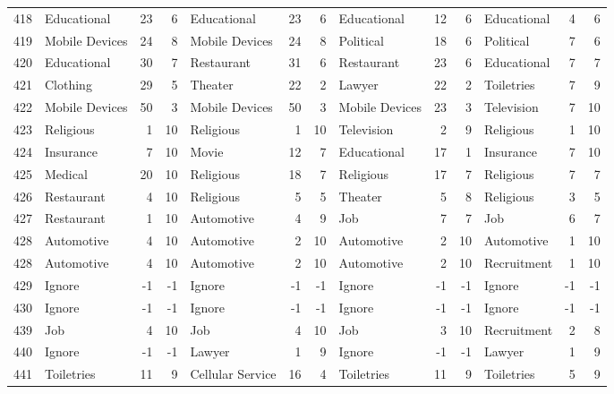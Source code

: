 \begin{figure}[htbp]
\begin{tabular}{rlrrlrrlrrlrr}
    418   & Educational & 23    & 6     & Educational & 23    & 6     & Educational & 12    & 6     & Educational & 4     & 6 \\
    419   & Mobile Devices & 24    & 8     & Mobile Devices & 24    & 8     & Political & 18    & 6     & Political & 7     & 6 \\
    420   & Educational & 30    & 7     & Restaurant & 31    & 6     & Restaurant & 23    & 6     & Educational & 7     & 7 \\
    421   & Clothing & 29    & 5     & Theater & 22    & 2     & Lawyer & 22    & 2     & Toiletries & 7     & 9 \\
    422   & Mobile Devices & 50    & 3     & Mobile Devices & 50    & 3     & Mobile Devices & 23    & 3     & Television & 7     & 10 \\
    423   & Religious & 1     & 10    & Religious & 1     & 10    & Television & 2     & 9     & Religious & 1     & 10 \\
    424   & Insurance & 7     & 10    & Movie & 12    & 7     & Educational & 17    & 1     & Insurance & 7     & 10 \\
    425   & Medical & 20    & 10    & Religious & 18    & 7     & Religious & 17    & 7     & Religious & 7     & 7 \\
    426   & Restaurant & 4     & 10    & Religious & 5     & 5     & Theater & 5     & 8     & Religious & 3     & 5 \\
    427   & Restaurant & 1     & 10    & Automotive & 4     & 9     & Job   & 7     & 7     & Job   & 6     & 7 \\
    428   & Automotive & 4     & 10    & Automotive & 2     & 10    & Automotive & 2     & 10    & Automotive & 1     & 10 \\
    428   & Automotive & 4     & 10    & Automotive & 2     & 10    & Automotive & 2     & 10    & Recruitment & 1     & 10 \\
    429   & Ignore & -1    & -1    & Ignore & -1    & -1    & Ignore & -1    & -1    & Ignore & -1    & -1 \\
    430   & Ignore & -1    & -1    & Ignore & -1    & -1    & Ignore & -1    & -1    & Ignore & -1    & -1 \\
    439   & Job   & 4     & 10    & Job   & 4     & 10    & Job   & 3     & 10    & Recruitment & 2     & 8 \\
    440   & Ignore & -1    & -1    & Lawyer & 1     & 9     & Ignore & -1    & -1    & Lawyer & 1     & 9 \\
    441   & Toiletries & 11    & 9     & Cellular Service & 16    & 4     & Toiletries & 11    & 9     & Toiletries & 5     & 9 \\

\end{tabular}
\end{figure}
